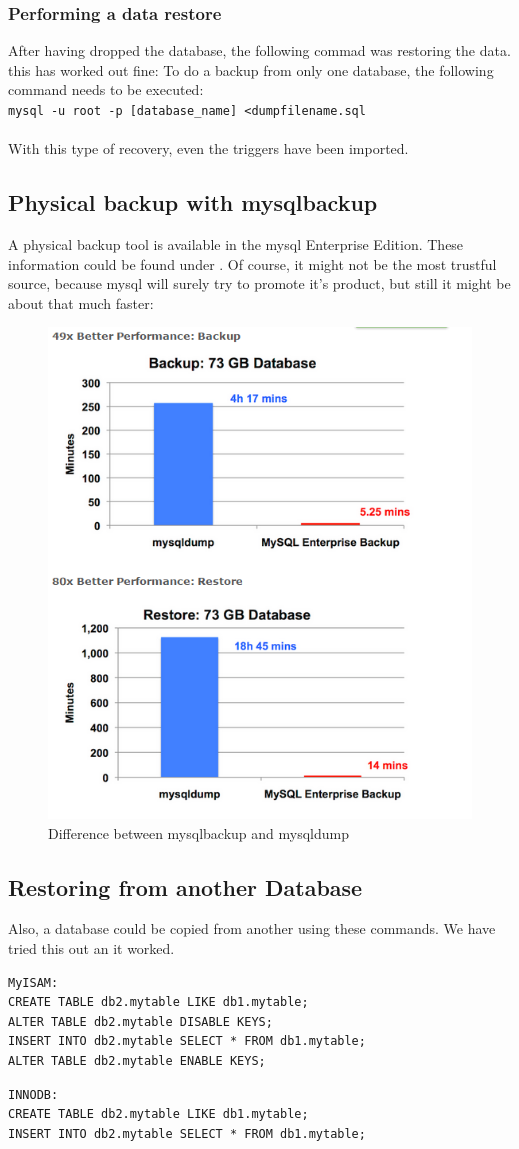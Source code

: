 \documentclass[10pt]{article}
\begin{document}
\subsubsection{Performing a data restore}
After having dropped the database, the following commad was restoring the data. this has worked out fine:
To do a backup from only one database, the following command needs to be executed: \\
\texttt{mysql -u root -p [database\_name] \textless dumpfilename.sql} \\ \\
With this type of recovery, even the triggers have been imported.
\newpage
\subsection{Physical backup with mysqlbackup}
A physical backup tool is available in the mysql Enterprise Edition. These information could be found under \cite{mysqlenterprisebackup}.
Of course, it might not be the most trustful source, because mysql will surely try to promote it's product, but still it might be about that much faster:
\begin{figure}[!h]
	\begin{center}
		\includegraphics[width=0.7\linewidth]{pictures/mysqlentbackup}
		\caption{Difference between mysqlbackup and mysqldump }
		\label{differenceent}
	\end{center}
\end{figure}\FloatBarrier
\subsection{Restoring from another Database}
Also, a database could be copied from another using these commands.
We have tried this out an it worked.\cite{so1}
\begin{lstlisting}    
MyISAM:
CREATE TABLE db2.mytable LIKE db1.mytable;
ALTER TABLE db2.mytable DISABLE KEYS;
INSERT INTO db2.mytable SELECT * FROM db1.mytable;
ALTER TABLE db2.mytable ENABLE KEYS;
 \end{lstlisting}    
 \begin{lstlisting}    
INNODB:
CREATE TABLE db2.mytable LIKE db1.mytable;
INSERT INTO db2.mytable SELECT * FROM db1.mytable;
  \end{lstlisting}    
\end{document}
